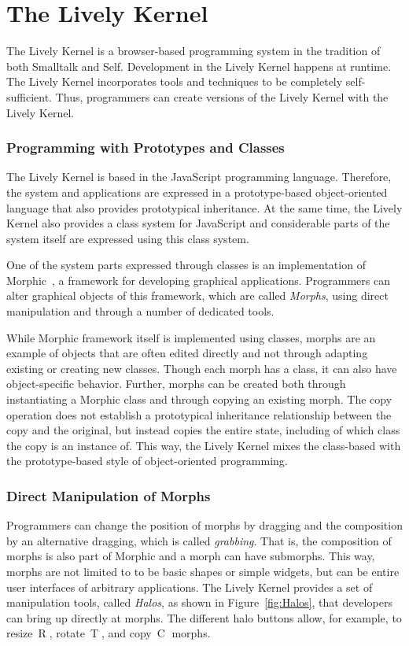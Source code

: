 \section{The Lively Kernel}

The Lively Kernel is a browser-based programming system in the tradition of both Smalltalk and Self.
Development in the Lively Kernel happens at runtime.
The Lively Kernel incorporates tools and techniques to be completely self-sufficient.
Thus, programmers can create versions of the Lively Kernel with the Lively Kernel.

\subsubsection{Programming with Prototypes and Classes}

The Lively Kernel is based in the JavaScript programming language.
Therefore, the system and applications are expressed in a prototype-based object-oriented language that also provides prototypical inheritance.
At the same time, the Lively Kernel also provides a class system for JavaScript and considerable parts of the system itself are expressed using this class system.

One of the system parts expressed through classes is an implementation of Morphic~\cite{Maloney1995Mor}, a framework for developing graphical applications.
Programmers can alter graphical objects of this framework, which are called \emph{Morphs}, using direct manipulation and through a number of dedicated tools.

While Morphic framework itself is implemented using classes, morphs are an example of objects that are often edited directly and not through adapting existing or creating new classes.
Though each morph has a class, it can also have object-specific behavior.
Further, morphs can be created both through instantiating a Morphic class and through copying an existing morph.
The copy operation does not establish a prototypical inheritance relationship between the copy and the original, but instead copies the entire state, including of which class the copy is an instance of.
This way, the Lively Kernel mixes the class-based with the prototype-based style of object-oriented programming.

\subsubsection{Direct Manipulation of Morphs}

Programmers can change the position of morphs by dragging and the composition by an alternative dragging, which is called \emph{grabbing}.
That is, the composition of morphs is also part of Morphic and a morph can have submorphs.
This way, morphs are not limited to to be basic shapes or simple widgets, but can be entire user interfaces of arbitrary applications.
The Lively Kernel provides a set of manipulation tools, called \emph{Halos}, as shown in Figure~\ref{fig:Halos}, that developers can bring up directly at morphs.
The different halo buttons allow, for example, to resize~\textcircled{R}, rotate~\textcircled{T}, and copy~\textcircled{C} morphs.

